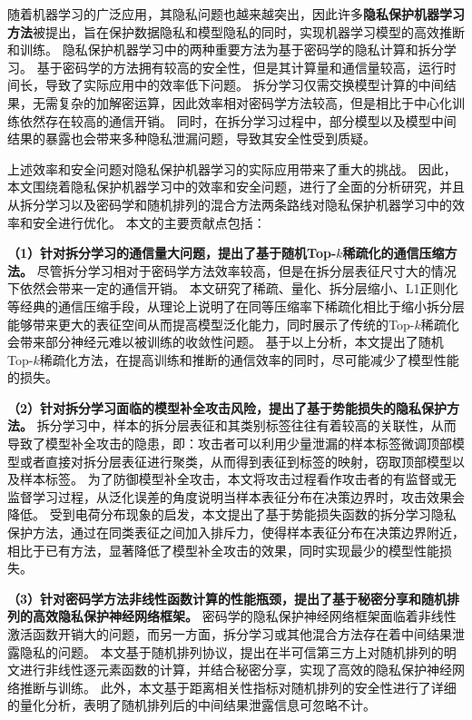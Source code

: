\cleardoublepage
{}
随着机器学习的广泛应用，其隐私问题也越来越突出，因此许多\textbf{隐私保护机器学习方法}被提出，旨在保护数据隐私和模型隐私的同时，实现机器学习模型的高效推断和训练。
%
隐私保护机器学习中的两种重要方法为基于密码学的隐私计算和拆分学习。
基于密码学的方法拥有较高的安全性，但是其计算量和通信量较高，运行时间长，导致了实际应用中的效率低下问题。
拆分学习仅需交换模型计算的中间结果，无需复杂的加解密运算，因此效率相对密码学方法较高，但是相比于中心化训练依然存在较高的通信开销。
同时，在拆分学习过程中，部分模型以及模型中间结果的暴露也会带来多种隐私泄漏问题，导致其安全性受到质疑。
%

上述效率和安全问题对隐私保护机器学习的实际应用带来了重大的挑战。
%
因此，本文围绕着隐私保护机器学习中的效率和安全问题，进行了全面的分析研究，并且从拆分学习以及密码学和随机排列的混合方法两条路线对隐私保护机器学习中的效率和安全进行优化。
%
本文的主要贡献点包括：


\textbf{（1）针对拆分学习的通信量大问题，提出了基于随机Top-$k$稀疏化的通信压缩方法。}
尽管拆分学习相对于密码学方法效率较高，但是在拆分层表征尺寸大的情况下依然会带来一定的通信开销。
%
本文研究了稀疏、量化、拆分层缩小、L1正则化等经典的通信压缩手段，从理论上说明了在同等压缩率下稀疏化相比于缩小拆分层能够带来更大的表征空间从而提高模型泛化能力，同时展示了传统的Top-$k$稀疏化会带来部分神经元难以被训练的收敛性问题。
%
基于以上分析，本文提出了随机Top-$k$稀疏化方法，在提高训练和推断的通信效率的同时，尽可能减少了模型性能的损失。

\textbf{（2）针对拆分学习面临的模型补全攻击风险，提出了基于势能损失的隐私保护方法。}
拆分学习中，样本的拆分层表征和其类别标签往往有着较高的关联性，从而导致了模型补全攻击的隐患，即：攻击者可以利用少量泄漏的样本标签微调顶部模型或者直接对拆分层表征进行聚类，从而得到表征到标签的映射，窃取顶部模型以及样本标签。
%
为了防御模型补全攻击，本文将攻击过程看作攻击者的有监督或无监督学习过程，从泛化误差的角度说明当样本表征分布在决策边界时，攻击效果会降低。
%
受到电荷分布现象的启发，本文提出了基于势能损失函数的拆分学习隐私保护方法，通过在同类表征之间加入排斥力，使得样本表征分布在决策边界附近，相比于已有方法，显著降低了模型补全攻击的效果，同时实现最少的模型性能损失。
%

\textbf{（3）针对密码学方法非线性函数计算的性能瓶颈，提出了基于秘密分享和随机排列的高效隐私保护神经网络框架。}
密码学的隐私保护神经网络框架面临着非线性激活函数开销大的问题，而另一方面，拆分学习或其他混合方法存在着中间结果泄露隐私的问题。
%
本文基于随机排列协议，提出在半可信第三方上对随机排列的明文进行非线性逐元素函数的计算，并结合秘密分享，实现了高效的隐私保护神经网络推断与训练。%
%
此外，本文基于距离相关性指标对随机排列的安全性进行了详细的量化分析，表明了随机排列后的中间结果泄露信息可忽略不计。


